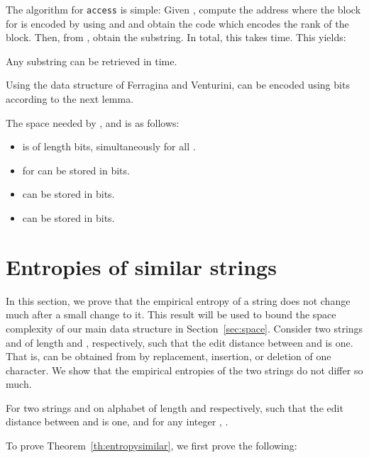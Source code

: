 \documentclass{llncs}
\begin{document}
The algorithm for \textnormal{\texttt{access}} is simple:
Given , compute the address where the block for  is encoded by
using  and  and obtain the code which encodes the rank
of the block.
Then, from , obtain the substring.
In total, this takes  time.
This yields:

\begin{lemma}
Any substring  can be retrieved in
 time.
\end{lemma}

Using the data structure of Ferragina and Venturini,
 can be encoded using  bits according to the next lemma.


\begin{lemma}\label{lem:FV}
The space needed by , and  is as follows:
\begin{itemize}
\item[{\raise0.3pt\hbox{}}]
 is of length  bits, simultaneously for all .
\item[{\raise0.3pt\hbox{}}]
 for  can be stored in
 bits.
\item[{\raise0.3pt\hbox{}}]
 can be stored in  bits.
\item[{\raise0.3pt\hbox{}}]
 can be stored in  bits.
\end{itemize}
\end{lemma}





\section{Entropies of similar strings}\label{sec:entropysimilar}

In this section, we prove that the empirical entropy of a string does not
change much after a small change to it.
This result will be used to bound the space complexity of our main
data structure in Section~\ref{sec:space}.
Consider two strings  and  of length  and ,
respectively, such that the edit distance between  and  is one.
That is,  can be obtained from  by replacement, insertion, or deletion of one character.
We show that the empirical entropies of the two strings
do not differ so much.
\begin{theorem}\label{th:entropysimilar}
For two strings  and  on alphabet 
of length  and  respectively,
such that the edit distance between  and  is one, and for any integer ,
.
\end{theorem}

To prove Theorem~\ref{th:entropysimilar}, we first prove the following:
\end{document}
